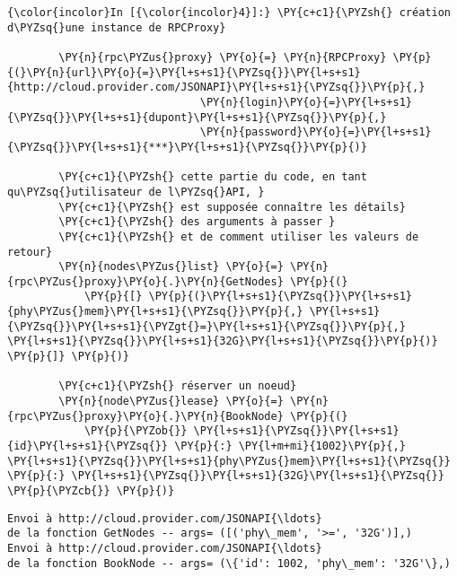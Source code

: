    \begin{Verbatim}[commandchars=\\\{\}]
{\color{incolor}In [{\color{incolor}4}]:} \PY{c+c1}{\PYZsh{} création d\PYZsq{}une instance de RPCProxy}
        
        \PY{n}{rpc\PYZus{}proxy} \PY{o}{=} \PY{n}{RPCProxy} \PY{p}{(}\PY{n}{url}\PY{o}{=}\PY{l+s+s1}{\PYZsq{}}\PY{l+s+s1}{http://cloud.provider.com/JSONAPI}\PY{l+s+s1}{\PYZsq{}}\PY{p}{,} 
                              \PY{n}{login}\PY{o}{=}\PY{l+s+s1}{\PYZsq{}}\PY{l+s+s1}{dupont}\PY{l+s+s1}{\PYZsq{}}\PY{p}{,}
                              \PY{n}{password}\PY{o}{=}\PY{l+s+s1}{\PYZsq{}}\PY{l+s+s1}{***}\PY{l+s+s1}{\PYZsq{}}\PY{p}{)}
        
        \PY{c+c1}{\PYZsh{} cette partie du code, en tant qu\PYZsq{}utilisateur de l\PYZsq{}API, }
        \PY{c+c1}{\PYZsh{} est supposée connaître les détails}
        \PY{c+c1}{\PYZsh{} des arguments à passer }
        \PY{c+c1}{\PYZsh{} et de comment utiliser les valeurs de retour}
        \PY{n}{nodes\PYZus{}list} \PY{o}{=} \PY{n}{rpc\PYZus{}proxy}\PY{o}{.}\PY{n}{GetNodes} \PY{p}{(} 
            \PY{p}{[} \PY{p}{(}\PY{l+s+s1}{\PYZsq{}}\PY{l+s+s1}{phy\PYZus{}mem}\PY{l+s+s1}{\PYZsq{}}\PY{p}{,} \PY{l+s+s1}{\PYZsq{}}\PY{l+s+s1}{\PYZgt{}=}\PY{l+s+s1}{\PYZsq{}}\PY{p}{,} \PY{l+s+s1}{\PYZsq{}}\PY{l+s+s1}{32G}\PY{l+s+s1}{\PYZsq{}}\PY{p}{)} \PY{p}{]} \PY{p}{)}
        
        \PY{c+c1}{\PYZsh{} réserver un noeud}
        \PY{n}{node\PYZus{}lease} \PY{o}{=} \PY{n}{rpc\PYZus{}proxy}\PY{o}{.}\PY{n}{BookNode} \PY{p}{(}
            \PY{p}{\PYZob{}} \PY{l+s+s1}{\PYZsq{}}\PY{l+s+s1}{id}\PY{l+s+s1}{\PYZsq{}} \PY{p}{:} \PY{l+m+mi}{1002}\PY{p}{,} \PY{l+s+s1}{\PYZsq{}}\PY{l+s+s1}{phy\PYZus{}mem}\PY{l+s+s1}{\PYZsq{}} \PY{p}{:} \PY{l+s+s1}{\PYZsq{}}\PY{l+s+s1}{32G}\PY{l+s+s1}{\PYZsq{}} \PY{p}{\PYZcb{}} \PY{p}{)}
\end{Verbatim}


    \begin{Verbatim}[commandchars=\\\{\}]
Envoi à http://cloud.provider.com/JSONAPI{\ldots}
de la fonction GetNodes -- args= ([('phy\_mem', '>=', '32G')],)
Envoi à http://cloud.provider.com/JSONAPI{\ldots}
de la fonction BookNode -- args= (\{'id': 1002, 'phy\_mem': '32G'\},)

    \end{Verbatim}


    
    
    
